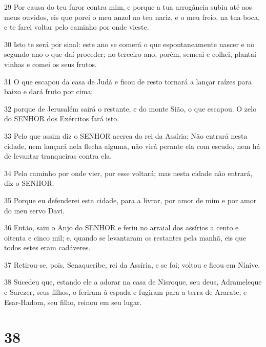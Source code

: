 \par 29 Por causa do teu furor contra mim, e porque a tua arrogância subiu até aos meus ouvidos, eis que porei o meu anzol no teu nariz, e o meu freio, na tua boca, e te farei voltar pelo caminho por onde vieste.
\par 30 Isto te será por sinal: este ano se comerá o que espontaneamente nascer e no segundo ano o que daí proceder; no terceiro ano, porém, semeai e colhei, plantai vinhas e comei os seus frutos.
\par 31 O que escapou da casa de Judá e ficou de resto tornará a lançar raízes para baixo e dará fruto por cima;
\par 32 porque de Jerusalém sairá o restante, e do monte Sião, o que escapou. O zelo do SENHOR dos Exércitos fará isto.
\par 33 Pelo que assim diz o SENHOR acerca do rei da Assíria: Não entrará nesta cidade, nem lançará nela flecha alguma, não virá perante ela com escudo, nem há de levantar tranqueiras contra ela.
\par 34 Pelo caminho por onde vier, por esse voltará; mas nesta cidade não entrará, diz o SENHOR.
\par 35 Porque eu defenderei esta cidade, para a livrar, por amor de mim e por amor do meu servo Davi.
\par 36 Então, saiu o Anjo do SENHOR e feriu no arraial dos assírios a cento e oitenta e cinco mil; e, quando se levantaram os restantes pela manhã, eis que todos estes eram cadáveres.
\par 37 Retirou-se, pois, Senaqueribe, rei da Assíria, e se foi; voltou e ficou em Nínive.
\par 38 Sucedeu que, estando ele a adorar na casa de Nisroque, seu deus, Adrameleque e Sarezer, seus filhos, o feriram à espada e fugiram para a terra de Ararate; e Esar-Hadom, seu filho, reinou em seu lugar.

\chapter{38}

